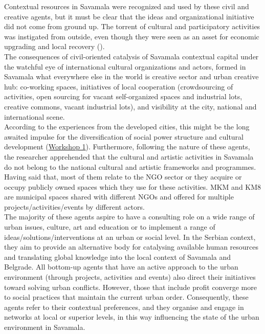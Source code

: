 \documentclass[11pt]{report}
\begin{document}
Contextual resources in Savamala were recognized and used by these civil and creative agents, but it must be clear that the ideas and organizational initiative  did not come from ground up.
The torrent of cultural and participatory activities was instigated from outside, even though they were seen as an asset for economic upgrading and local recovery (\cite{British council}).
\\

The consequences of civil-oriented catalysis of Savamala contextual capital under the watchful eye of international cultural organizations and actors, formed in Savamala what everywhere else in the world is creative sector and urban creative hub: co-working spaces, initiatives of local cooperation (crowdsourcing of activities, open sourcing for vacant self-organized spaces and industrial lots, creative commons, vacant industrial lots), and visibility at the city, national and international scene.
\\

According to the experiences from the developed cities, this might be the long awaited impulse for the diversification of social power structure and cultural development
(\href{Expert Workshop}{Workshop 1}).
Furthermore, following the nature of these agents, the researcher apprehended that the cultural and artistic activities in Savamala do not belong to the national cultural and artistic frameworks and programmes.
Having said that, most of them relate to the NGO sector or they acquire or occupy publicly owned spaces which they use for these activities.
MKM and KM8 are municipal spaces shared with different NGOs and offered for multiple projects/activities/events by different actors.
\\

The majority of these agents aspire to have a consulting role on a wide range of urban issues, culture, art and education or to implement a range of ideas/solutions/interventions at an urban or social level.
In the Serbian context, they aim to provide an alternative body for catalysing available human resources and translating global knowledge into the local context of Savamala and Belgrade.
All bottom-up agents that have an active approach to the urban environment (through projects, activities and events) also direct their initiatives toward solving urban conflicts. However, those that include profit converge more to social practices that maintain the current urban order.
Consequently, these agents refer to their contextual preferences, and they organise and engage in networks at local or superior levels, in this way influencing the state of the urban environment in Savamala.
    
\end{document}
